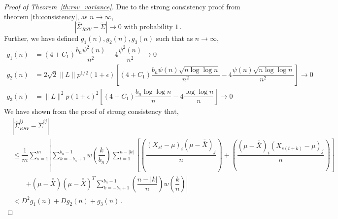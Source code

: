 \documentclass[11pt]{article}
\theoremstyle{remark}
\begin{document}
\begin{proof}[Proof of Theorem~\ref{th:rsv_variance}]
 Due to the strong consistency proof from theorem \ref{th:consistency}, as $n \to \infty$,
\begin{equation}
\label{eq:rsv_asv_consis}
 \left|\hat{\Sigma}_{RSV} -  \tilde{\Sigma}\right| \to 0 \text{ with probability 1}\,. 
\end{equation}
Further, we have defined $g_1(n), g_2(n), g_3(n)$ such that as $n \to \infty$,
\begin{align*}
    g_1(n) &= (4+C_1)\dfrac{b_n \psi^2(n)}{n^2} - 4\dfrac{\psi^2(n)}{n^2} \to 0\\
    g_2(n) &= 2\sqrt{2}\|L\|p^{1/2}(1+\epsilon)\left[(4+C_1)\dfrac{b_n\psi(n)\sqrt{n\log \log n}}{n^2} - 4\dfrac{\psi(n)\sqrt{n\log \log n}}{n^2}\right] \to 0\\
    g_3(n) &= \|L\|^2 p (1+\epsilon)^2\left[(4+C_1)\dfrac{b_n \log\log n}{n} - 4 \dfrac{\log \log n}{n}\right] \to 0
\end{align*}
%
We have shown from the proof of strong consistency that,
\begin{align*}
 &\left| \hat{\Sigma}_{RSV}^{ij} - \tilde{\Sigma}^{ij} \right|\\
 & \leq \dfrac{1}{m} \sum_{s=1}^m \left| \sum_{k=-b_n+1}^{b_n-1} w \left(\dfrac{k}{b_n} \right) \sum_{t=1}^{n-|k|}   \left[ \left( \dfrac{(X_{st} - \mu)_i(\mu-\bar{\bar{X}})_j}{n}\right)+ \left(\dfrac{(\mu-\bar{\bar{X}})_i(X_{s(t+k)}-\mu)_j}{n}\right) \right] \right.\\
& \quad \quad  \left. + (\mu-\bar{\bar{X}})(\mu-\bar{\bar{X}})^T\sum_{k=-b_n+1}^{b_n-1}\left(\dfrac{n-|k|}{n}\right)w\left(\dfrac{k}{n}\right) \right| \\ 
 & < D^2g_1(n) + Dg_2(n) + g_3(n)\,.
\end{align*}


\end{proof}
\end{document}
